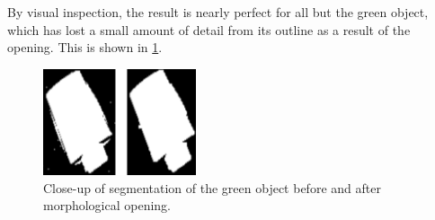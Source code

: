 By visual inspection, the result is nearly perfect for all but the green object,
which has lost a small amount of detail from its outline as a result of the
opening. This is shown in \cref{fig:5.1_b}.

\begin{figure}[h]
    \centering
    \includegraphics[width=0.4\textwidth]{figures/task_5_1_b.png}
    \caption{Close-up of segmentation of the green object before and after
    morphological opening.}
    \label{fig:5.1_b}
\end{figure}

